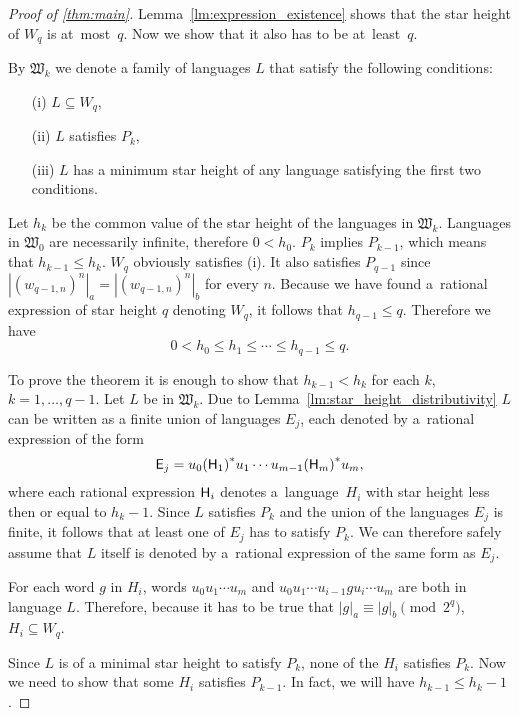 \begin{proof}[Proof of \autoref*{thm:main}]
    Lemma~\ref*{lm:expression_existence} shows that the star height of $W_q$ is at~most~$q$. Now we show that it also has to be at~least~$q$.

    By $\mathfrak{W}_k$ we denote a family of languages $L$ that satisfy the following conditions:
    \begin{itemize}
        \item[(i)] $L \subseteq W_q$,
        \item[(ii)] $L$ satisfies $P_k$,
        \item[(iii)] $L$ has a minimum star height of any language satisfying the first two conditions.
    \end{itemize}

    Let $h_k$ be the common value of the star height of the languages in $\mathfrak{W}_k$. Languages in $\mathfrak{W}_0$ are necessarily infinite, therefore $0 < h_0$. $P_k$ implies $P_{k-1}$, which means that $h_{k-1} \leq h_k$. $W_q$ obviously satisfies (i). It also satisfies $P_{q-1}$ since $|{(w_{q-1,n})}^n|_a = |{(w_{q-1,n})}^n|_b$ for every $n$. Because we have found a~rational expression of star height $q$ denoting $W_q$, it follows that $h_{q-1} \leq q$. Therefore we have
    \[
        0 < h_0 \leq h_1 \leq \dotsb \leq h_{q-1} \leq q.
    \]

    To prove the theorem it is enough to show that $h_{k-1} < h_k$ for each $k$, $k=1, \dotsc, q-1$. Let $L$ be in $\mathfrak{W}_k$. Due to Lemma~\ref*{lm:star_height_distributivity} $L$ can be written as a finite union of languages $E_j$, each denoted by a~rational expression of the form
    \[
        {\mathsf{E}}_j = u_0{({\mathsf{H}}_1)}^*u_1 \dotsm u_{m-1}{({\mathsf{H}}_m)}^*u_m,
    \]
    where each rational expression ${\mathsf{H}}_i$ denotes a~language~$H_i$ with star height less then or equal to $h_k-1$. Since $L$ satisfies $P_k$ and the union of the languages $E_j$ is finite, it follows that at least one of $E_j$ has to satisfy $P_k$. We can therefore safely assume that $L$ itself is denoted by a~rational expression of the same form as $E_j$.

    For each word $g$ in $H_i$, words $u_0 u_1 \dotsm u_m$ and $u_0 u_1 \dotsm u_{i-1} g u_i \dotsm u_m$ are both in language $L$. Therefore, because it has to be true that $|g|_a \equiv |g|_b \pmod{2^q}$, $H_i \subseteq W_q$.

    Since $L$ is of a minimal star height to satisfy $P_k$, none of the $H_i$ satisfies $P_k$. Now we need to show that some $H_i$ satisfies $P_{k-1}$. In fact, we will have $h_{k-1} \leq h_k - 1$.


\end{proof}
